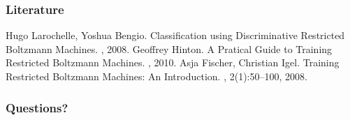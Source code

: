 \documentclass{beamer}
\begin{document}
  \begin{frame}[allowframebreaks]
  \frametitle<presentation>{Literature}    
  \begin{thebibliography}{10}    
  \beamertemplatearticlebibitems
    Hugo Larochelle, Yoshua Bengio.
    \newblock Classification using Discriminative Restricted Boltzmann Machines.
    , 2008.
    Geoffrey Hinton.
    \newblock A Pratical Guide to Training Restricted Boltzmann Machines.
    , 2010.
    Asja Fischer, Christian Igel.
    \newblock Training Restricted Boltzmann Machines: An Introduction.
    , 2(1):50--100, 2008.
  \end{thebibliography}
  \end{frame}
  \begin{frame}[plain]
  \frametitle{Questions?}
  \end{frame}
\end{document}
